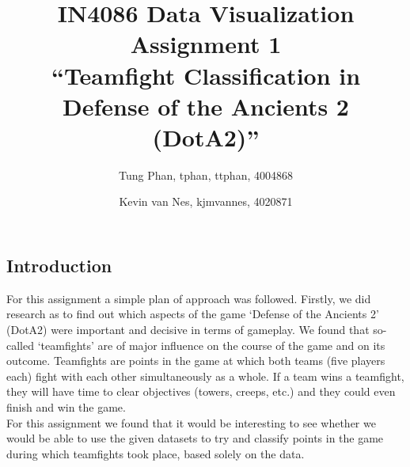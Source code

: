 \documentclass[11pt,twoside,a4paper]{article}
\title{
  IN4086 Data Visualization\\
  Assignment 1\\
  ``Teamfight Classification in Defense of the Ancients 2 (DotA2)''
}
\author{
    Tung Phan, tphan, ttphan, 4004868 \and
    Kevin van Nes, kjmvannes, 4020871
}
\begin{document}
\maketitle
\newpage

\subsection*{Introduction}
For this assignment a simple plan of approach was followed. Firstly, we did research as to find out which aspects of the game `Defense of the Ancients 2' (DotA2) were important and decisive in terms of gameplay. We found that so-called `teamfights' are of major influence on the course of the game and on its outcome. Teamfights are points in the game at which both teams (five players each) fight with each other simultaneously as a whole. If a team wins a teamfight, they will have time to clear objectives (towers, creeps, etc.) and they could even finish and win the game.\\
For this assignment we found that it would be interesting to see whether we would be able to use the given datasets to try and classify points in the game during which teamfights took place, based solely on the data.
\end{document}
